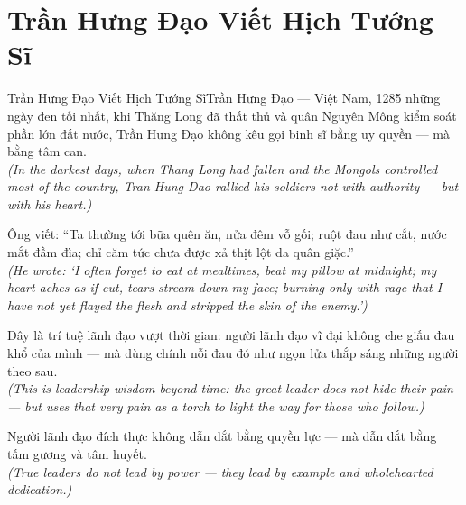 \section{Trần Hưng Đạo Viết Hịch Tướng Sĩ}
\begin{truyen}{Trần Hưng Đạo Viết Hịch Tướng Sĩ}{Trần Hưng Đạo --- Việt Nam, 1285}
 những ngày đen tối nhất, khi Thăng Long đã thất thủ và quân Nguyên Mông kiểm soát phần lớn đất nước, Trần Hưng Đạo không kêu gọi binh sĩ bằng uy quyền --- mà bằng tâm can.\\[4pt]
\textit{(In the darkest days, when Thang Long had fallen and the Mongols controlled most of the country, Tran Hung Dao rallied his soldiers not with authority --- but with his heart.)}

Ông viết: ``Ta thường tới bữa quên ăn, nửa đêm vỗ gối; ruột đau như cắt, nước mắt đầm đìa; chỉ căm tức chưa được xả thịt lột da quân giặc.''\\[4pt]
\textit{(He wrote: `I often forget to eat at mealtimes, beat my pillow at midnight; my heart aches as if cut, tears stream down my face; burning only with rage that I have not yet flayed the flesh and stripped the skin of the enemy.')}

Đây là trí tuệ lãnh đạo vượt thời gian: người lãnh đạo vĩ đại không che giấu đau khổ của mình --- mà dùng chính nỗi đau đó như ngọn lửa thắp sáng những người theo sau.\\[4pt]
\textit{(This is leadership wisdom beyond time: the great leader does not hide their pain --- but uses that very pain as a torch to light the way for those who follow.)}

\end{truyen}
\begin{baihoc}
  Người lãnh đạo đích thực không dẫn dắt bằng quyền lực --- mà dẫn dắt bằng tấm gương và tâm huyết.\\[4pt]
  \textit{(True leaders do not lead by power --- they lead by example and wholehearted dedication.)}
\end{baihoc}
